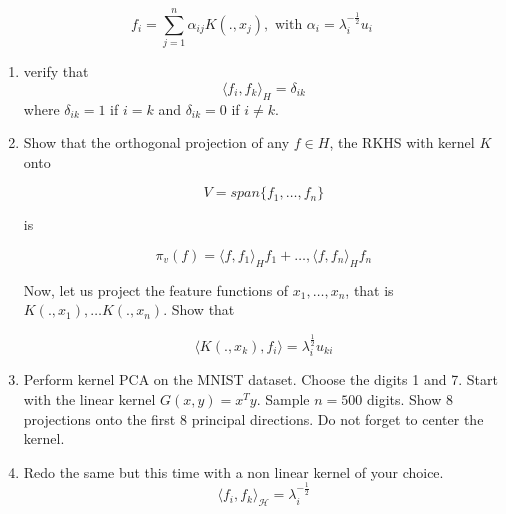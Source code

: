 \documentclass{article}
\begin{document}
\[f_i=\sum_{j=1}^n \alpha_{ij} K(.,x_j), \mbox{ with } \alpha_i = \lambda_i^{-\frac{1}{2}}u_i\]

\begin{enumerate}

    \item verify that \[\langle f_i,f_k \rangle_H=\delta_{ik}\]
    where $\delta_{ik}=1$ if $i=k$ and $\delta_{ik}=0$ if $i \not = k$. 
    
    \item Show that the orthogonal projection of any $f \in H$, the RKHS with kernel $K$ onto 
        
        \[V=span\{f_1,\ldots,f_n\}\]

        is

        \[\pi_v(f)=\langle f,f_1\rangle_H f_1+\ldots,\langle f,f_n\rangle_H f_n\]

        Now, let us project the feature functions of $x_1,\ldots,x_n$, that is $K(.,x_1), \ldots K(.,x_n)$. Show that 

        \[\langle K(.,x_k),f_i \rangle = \lambda_i^\frac{1}{2} u_{ki}\]
    
    \item Perform kernel PCA on the MNIST dataset. Choose the digits 1 and 7. 
    Start with the linear kernel $G(x,y)=x^Ty$. Sample $n=500$ digits. Show 8 
    projections onto the first 8 principal directions. Do not forget to center the 
    kernel. 


    \item Redo the same but this time with a non linear kernel of your choice.  
    \[\langle f_i, f_k \rangle_{\mathcal{H}} = \lambda^{-\frac{1}{2}}_i\]
    

\end{enumerate}
\end{document}
